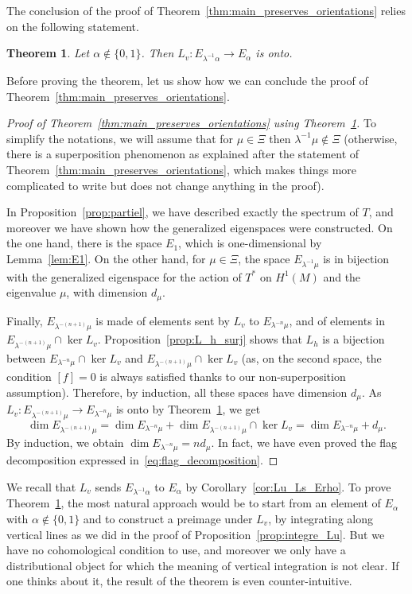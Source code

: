\documentclass[10pt]{amsart}
\newtheorem{thm}{Theorem}[section]
\theoremstyle{definition}
\numberwithin{equation}{section}
\begin{document}
The conclusion of the proof of Theorem~\ref{thm:main_preserves_orientations}
relies on the following statement.
\begin{thm}
\label{thm:Lv_integre} Let $\alpha \notin \{0,1\}$. Then $L_v :
E_{\lambda^{-1}\alpha} \to E_\alpha$ is onto.
\end{thm}
Before proving the theorem, let us show how we can conclude the proof of
Theorem~\ref{thm:main_preserves_orientations}.

\begin{proof}[Proof of Theorem~\ref{thm:main_preserves_orientations} using
Theorem~\ref{thm:Lv_integre}] To simplify the notations, we will assume that
for $\mu \in \Xi$ then $\lambda^{-1} \mu \notin \Xi$ (otherwise, there is a
superposition phenomenon as explained after the statement of
Theorem~\ref{thm:main_preserves_orientations}, which makes things more
complicated to write but does not change anything in the proof).

In Proposition~\ref{prop:partiel}, we have described exactly the spectrum of
$T$, and moreover we have shown how the generalized eigenspaces were
constructed. On the one hand, there is the space $E_1$, which is
one-dimensional by Lemma~\ref{lem:E1}. On the other hand, for $\mu \in \Xi$,
the space $E_{\lambda^{-1}\mu}$ is in bijection with the generalized
eigenspace for the action of $T^*$ on $H^1(M)$ and the eigenvalue $\mu$, with
dimension $d_\mu$.

Finally, $E_{\lambda^{-(n+1)} \mu}$ is made of elements sent by $L_v$ to
$E_{\lambda^{-n} \mu}$, and of elements in $E_{\lambda^{-(n+1)} \mu} \cap
\ker L_v$. Proposition~\ref{prop:L_h_surj} shows that $L_h$ is a bijection
between $E_{\lambda^{-n} \mu} \cap \ker L_v$ and $E_{\lambda^{-(n+1)} \mu}
\cap \ker L_v$ (as, on the second space, the condition $[f] = 0$ is always
satisfied thanks to our non-superposition assumption). Therefore, by
induction, all these spaces have dimension $d_\mu$. As $L_v :
E_{\lambda^{-(n+1)} \mu} \to E_{\lambda^{-n} \mu}$ is onto by
Theorem~\ref{thm:Lv_integre}, we get
\begin{equation*}
\dim E_{\lambda^{-(n+1)} \mu} =
\dim E_{\lambda^{-n} \mu} + \dim E_{\lambda^{-(n+1)} \mu} \cap \ker L_v
= \dim E_{\lambda^{-n} \mu} + d_\mu.
\end{equation*}
By induction, we obtain $\dim E_{\lambda^{-n} \mu} = n d_\mu$. In fact, we
have even proved the flag decomposition expressed
in~\eqref{eq:flag_decomposition}.
\end{proof}

We recall that $L_v$ sends $E_{\lambda^{-1}\alpha}$ to $E_\alpha$ by
Corollary~\ref{cor:Lu_Ls_Erho}. To prove Theorem~\ref{thm:Lv_integre}, the
most natural approach would be to start from an element of $E_\alpha$ with
$\alpha\notin\{0,1\}$ and to construct a preimage under $L_v$, by integrating
along vertical lines as we did in the proof of
Proposition~\ref{prop:integre_Lu}. But we have no cohomological condition to
use, and moreover we only have a distributional object for which the meaning
of vertical integration is not clear. If one thinks about it, the result of
the theorem is even counter-intuitive.
\end{document}
